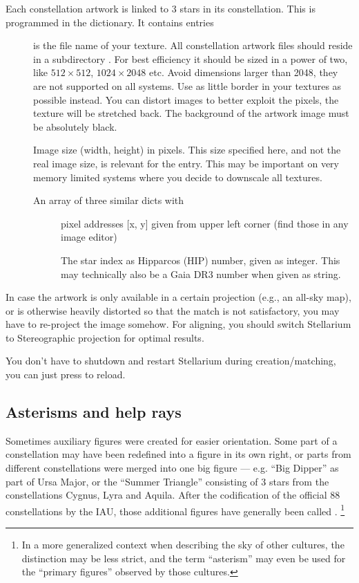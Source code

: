 Each constellation artwork is linked to 3 stars in its constellation. This
is programmed in the  dictionary. It contains entries
\begin{description}
\item[] is the file name of your texture. All constellation artwork files should reside in a subdirectory . 
  For best efficiency it should be
  sized in a power of two, like $512\times512$, $1024\times2048$
  etc. Avoid dimensions larger than 2048, they are not supported on
  all systems. Use as little border in your textures as possible instead.
  You can distort images to better exploit the pixels,
  the texture will be stretched back. The background of the artwork
  image must be absolutely black.
  \item[] Image size (width, height) in pixels. This size specified here, and not the real image size, is relevant for the  entry. 
  This may be important on very memory limited systems where you decide to downscale all textures.
  \item[] An array of three similar dicts with
  \begin{description}
  \item[] pixel addresses [x, y] given from upper left corner (find those in any image editor)
  \item[] The star index as Hipparcos (HIP) number, given as integer. This may technically also be a Gaia DR3 number when given as string.
  \end{description}
\end{description}
%
In case the artwork is only available in a certain projection (e.g.,
an all-sky map), or is otherwise heavily distorted so that the match
is not satisfactory, you may have to re-project the image somehow. For
aligning, you should switch Stellarium to Stereographic projection for
optimal results.

You don't have to shutdown and restart Stellarium during
creation/matching, you can just press  to reload.


\subsection{Asterisms and help rays}
\label{sec:skycultures:asterisms}
\label{SC:asterisms}

Sometimes auxiliary figures were created for easier orientation. Some part of a 
constellation may have been redefined into a figure in its own right, or  parts from different 
constellations were merged into one big figure --- e.g. ``Big Dipper'' as part of Ursa Major, or the 
``Summer Triangle'' consisting of 3 stars from the constellations Cygnus, Lyra and Aquila. 
After the codification of the official 88 constellations by the IAU, those additional figures
have generally been called . \footnote{In a more generalized context when describing the sky of
  other cultures, the distinction may be less strict, and the term ``asterism'' may even be used 
  for the ``primary figures'' observed by those cultures.}

